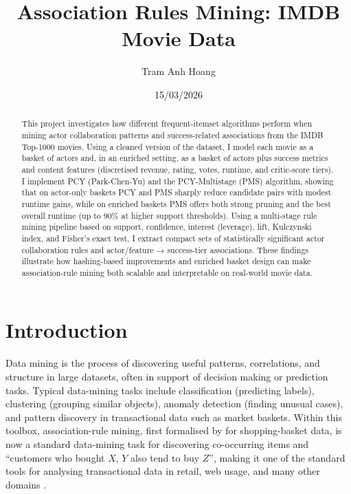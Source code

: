 \documentclass{article}  %
\title{Association Rules Mining: IMDB Movie Data}
\author[1*$\dag$]{Tram Anh Hoang}
\affil[1]{Data Science for Economic, Università degli Studi di Milano}
\date{15/03/2026}
\begin{document}
\maketitle


\begin{abstract}

This project investigates how different frequent-itemset algorithms perform when mining actor collaboration patterns and success-related associations from the IMDB Top-1000 movies. Using a cleaned version of the dataset, I model each movie as a basket of actors and, in an enriched setting, as a basket of actors plus success metrics and content features (discretised revenue, rating, votes, runtime, and critic-score tiers). I implement PCY (Park-Chen-Yu) and the PCY-Multistage (PMS) algorithm, showing that on actor-only baskets PCY and PMS sharply reduce candidate pairs with modest runtime gains, while on enriched baskets PMS offers both strong pruning and the best overall runtime (up to 90\% at higher support thresholds). Using a multi-stage rule mining pipeline based on support, confidence, interest (leverage), lift, Kulczynski index, and Fisher's exact test, I extract compact sets of statistically significant actor collaboration rules and actor/feature → success-tier associations. These findings illustrate how hashing-based improvements and enriched basket design can make association-rule mining both scalable and interpretable on real-world movie data.

\end{abstract}

\section{Introduction}

Data mining is the process of discovering useful patterns, correlations, and structure in large datasets, often in support of decision making or prediction tasks. Typical data-mining tasks include classification (predicting labels), clustering (grouping similar objects), anomaly detection (finding unusual cases), and pattern discovery in transactional data such as market baskets. Within this toolbox, association-rule mining, first formalised by \cite{agrawalMiningAssociationRules1993}  for shopping-basket data, is now a standard data-mining task for discovering co-occurring items and  “customers who bought \(X\), \(Y\) also tend to buy \(Z\)”, making it one of the standard tools for analysing transactional data in retail, web usage, and many other domains \parencite{MiningMassiveDatasets}.
\end{document}
